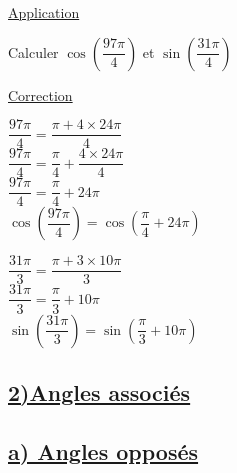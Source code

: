 \documentclass[12pt,a4paper]{article}
\begin{document}
\vspace{1.5em}

\begin{center}
    \textcolor{monRouge}{\underline{\Large Application}}
\end{center}

\noindent Calculer $\cos \left( \dfrac{97\pi}{4} \right)$ et $\sin \left( \dfrac{31\pi}{4} \right)$

\vspace{0.5em}

\begin{center}
    \textcolor{monRouge}{\underline{Correction}}
\end{center}

\noindent
\begin{minipage}[t]{0.45\textwidth}
    $\dfrac{97\pi}{4} = \dfrac{\pi + 4 \times 24\pi}{4}$ \\
    $\dfrac{97\pi}{4} = \dfrac{\pi}{4} + \dfrac{4 \times 24\pi}{4}$ \\
    $\dfrac{97\pi}{4} = \dfrac{\pi}{4} + 24\pi$ \\
    $\cos \left( \dfrac{97\pi}{4} \right) = \cos \left( \dfrac{\pi}{4} + 24\pi \right)$ \\
\end{minipage}
\hfill
\begin{minipage}[t]{0.45\textwidth}
    $\dfrac{31\pi}{3} = \dfrac{\pi + 3 \times 10\pi}{3}$ \\
    $\dfrac{31\pi}{3} = \dfrac{\pi}{3} + 10\pi$ \\
    $\sin \left( \dfrac{31\pi}{3} \right) = \sin \left( \dfrac{\pi}{3} + 10\pi \right)$ \\
\end{minipage}

\vspace{1.5em}

\subsection*{%
    \color{monRouge} \underline{2)Angles associés}%
}
\subsection*{%
    \color{monRouge} \underline{a) Angles opposés}%
}
\vspace{1em}
\end{document}
